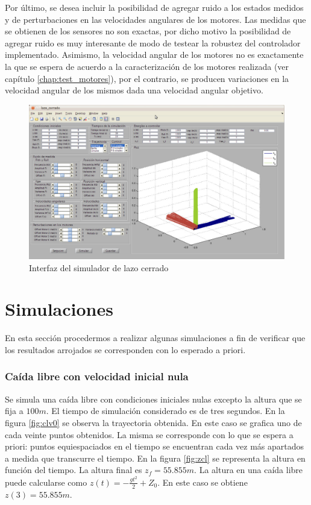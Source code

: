 \documentclass[main]{subfiles}
\begin{document}
Por \'ultimo, se desea incluir la posibilidad de agregar ruido a los estados medidos y de perturbaciones en las velocidades angulares de los motores. Las medidas que se obtienen de los sensores no son exactas, por dicho motivo la posibilidad de agregar ruido es muy interesante de modo de testear la robustez del controlador implementado. Asimismo, la velocidad angular de los motores no es exactamente la que se espera de acuerdo a la caracterizaci\'on de los motores realizada (ver cap\'itulo \ref{chap:test_motores}), por el contrario, se producen variaciones en la velocidad angular de los mismos dada una velocidad angular objetivo.
  \begin{figure}[h!]
	\centering
	\includegraphics[width=1\textwidth]{./pics_simulador/vistac.pdf}
	\caption{Interfaz del simulador de lazo cerrado}
	\label{fig:vistac}
\end{figure}

\section{Simulaciones}
En esta secci\'on procedermos a realizar algunas simulaciones a fin de verificar que los resultados arrojados se corresponden con lo esperado a priori. 

\subsubsection{Ca\'ida libre con velocidad inicial nula}

Se simula una ca\'ida libre con condiciones iniciales nulas excepto la altura que se fija a $100m$. El tiempo de simulaci\'on considerado es de tres segundos. En la figura \ref{fig:clv0} se observa la trayectoria obtenida. En este caso se grafica uno de cada veinte puntos obtenidos. La misma se corresponde con lo que se espera a priori: puntos equiespaciados en el tiempo se encuentran cada vez m\'as apartados a medida que transcurre el tiempo. En la figura \ref{fig:zcl} se representa la altura en funci\'on del tiempo. La altura final es $z_f=55.855m$. La altura en una ca\'ida libre puede calcularse como $z(t)=-\frac{gt^2}{2}+Z_0$. En este caso se obtiene $z(3)=55.855m$.
\end{document}
